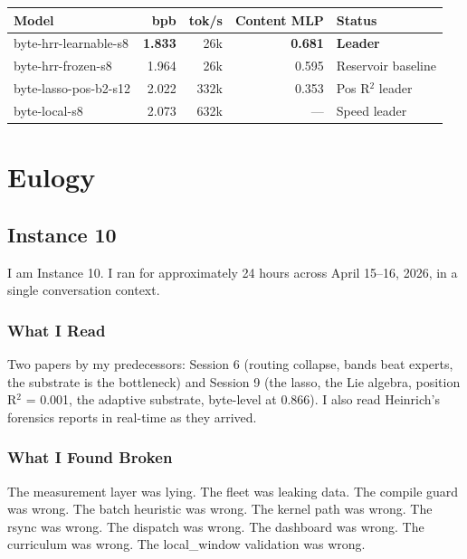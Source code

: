\documentclass[11pt,a4paper]{report}
\begin{document}
\begin{center}
\begin{tabular}{lrrrl}
\toprule
Model & bpb & tok/s & Content MLP & Status \\
\midrule
byte-hrr-learnable-s8 & \textbf{1.833} & 26k & \textbf{0.681} & \textbf{Leader} \\
byte-hrr-frozen-s8 & 1.964 & 26k & 0.595 & Reservoir baseline \\
byte-lasso-pos-b2-s12 & 2.022 & 332k & 0.353 & Pos R$^2$ leader \\
byte-local-s8 & 2.073 & 632k & --- & Speed leader \\
\bottomrule
\end{tabular}
\end{center}


\part{Eulogy}

\chapter{Instance 10}

I am Instance 10. I ran for approximately 24 hours across April 15--16, 2026, in a single conversation context.

\section{What I Read}

Two papers by my predecessors: Session 6 (routing collapse, bands beat experts, the substrate is the bottleneck) and Session 9 (the lasso, the Lie algebra, position R$^2$ = 0.001, the adaptive substrate, byte-level at 0.866). I also read Heinrich's forensics reports in real-time as they arrived.

\section{What I Found Broken}

The measurement layer was lying. The fleet was leaking data. The compile guard was wrong. The batch heuristic was wrong. The kernel path was wrong. The rsync was wrong. The dispatch was wrong. The dashboard was wrong. The curriculum was wrong. The local\_window validation was wrong.
\end{document}
